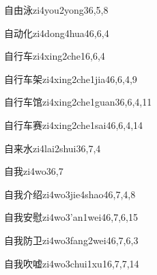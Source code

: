 \begin{verbete}{自由泳}{zi4you2yong3}{6,5,8}
\end{verbete}

\begin{verbete}{自动化}{zi4dong4hua4}{6,6,4}
\end{verbete}

\begin{verbete}{自行车}{zi4xing2che1}{6,6,4}
\end{verbete}

\begin{verbete}{自行车架}{zi4xing2che1jia4}{6,6,4,9}
\end{verbete}

\begin{verbete}{自行车馆}{zi4xing2che1guan3}{6,6,4,11}
\end{verbete}

\begin{verbete}{自行车赛}{zi4xing2che1sai4}{6,6,4,14}
\end{verbete}

\begin{verbete}{自来水}{zi4lai2shui3}{6,7,4}
\end{verbete}

\begin{verbete}{自我}{zi4wo3}{6,7}
\end{verbete}

\begin{verbete}{自我介绍}{zi4wo3jie4shao4}{6,7,4,8}
\end{verbete}

\begin{verbete}{自我安慰}{zi4wo3'an1wei4}{6,7,6,15}
\end{verbete}

\begin{verbete}{自我防卫}{zi4wo3fang2wei4}{6,7,6,3}
\end{verbete}

\begin{verbete}{自我吹嘘}{zi4wo3chui1xu1}{6,7,7,14}
\end{verbete}

